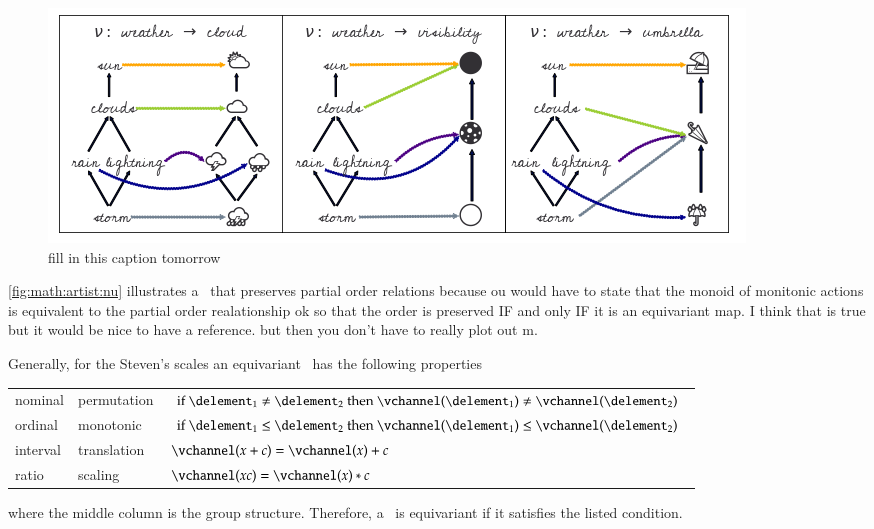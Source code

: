 \documentclass[journal]{vgtc}                %
\begin{document}
\begin{figure}[htb]
  \centering
  \includegraphics[width=1\columnwidth]{monoid_equivariant.png}
  \caption{fill in this caption tomorrow}
  \label{fig:math:artist:nu}
\end{figure}

\autoref{fig:math:artist:nu} illustrates a \vchannel\ that preserves partial order relations because 
ou would have to state that the monoid of monitonic actions is equivalent to the partial order realationship
ok
so that the order is preserved IF and only IF it is an equivariant map.
I think that is true but it would be nice to have a reference.
but then you don't have to really plot out m.

Generally, for the Steven's scales\cite{stevensTheoryScalesMeasurement1946} an equivariant \vchannel\ has the following properties
\begin{table}[H]
  \begin{tabulary}{\columnwidth}{llL}
      nominal & permutation &  $\text{if } \delement_1 \neq \delement_2 \text{ then } \vchannel (\delement_1) \neq\vchannel(\delement_2)$\\
      ordinal &  monotonic & $\text{if } \delement_1 \leq \delement_2 \text{ then } \vchannel (\delement_1) \leq \vchannel(\delement_2)$\\
      interval &  translation &  $\vchannel (x + c) = \vchannel(x) + c$ \\
      ratio &  scaling &  $\vchannel(xc) = \vchannel(x)*c $\\
  \end{tabulary}
\end{table}
\noindent where the middle column is the group structure. Therefore, a \vchannel\ is equivariant if it satisfies the listed condition.  
\end{document}
